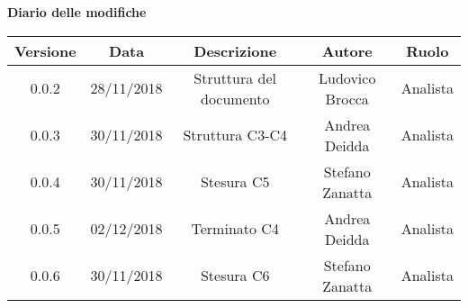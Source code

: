 \begin{center}
		\textbf{Diario delle modifiche}
	\end{center}
	\begin{center}
		\begin{tabular}{|c|c|c|c|c|}
			\hline
			\textbf{Versione} & \textbf{Data} & \textbf{Descrizione} & \textbf{Autore} & \textbf{Ruolo} \\
			\hline 
			0.0.2 & 28/11/2018 & Struttura del documento & Ludovico Brocca & Analista\\
			\hline
			0.0.3 & 30/11/2018 & Struttura C3-C4 & Andrea Deidda & Analista \\
			\hline
			0.0.4 & 30/11/2018 & Stesura C5 & Stefano Zanatta & Analista \\
			\hline
			0.0.5 & 02/12/2018 & Terminato C4 & Andrea Deidda & Analista \\
			\hline
			0.0.6 & 30/11/2018 & Stesura C6 & Stefano Zanatta & Analista \\
			\hline
		\end{tabular}
	\end{center}
\newpage